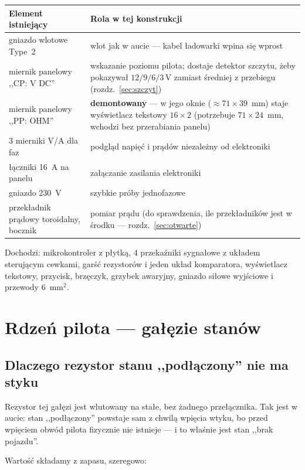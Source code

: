 \documentclass[a4paper,11pt]{article}
\newcommand{\volt}{\,\mathrm{V}}
\begin{document}
\begin{center}
\begin{tabular}{p{5.2cm}p{10.0cm}}
\toprule
Element istniejący & Rola w tej konstrukcji \\
\midrule
gniazdo wlotowe Type~2 & wlot jak w aucie --- kabel ładowarki wpina się wprost \\
miernik panelowy ,,CP: V DC'' & wskazanie poziomu pilota; dostaje detektor
  szczytu, żeby pokazywał $12/9/6/3\volt$ zamiast średniej z przebiegu
  (rozdz.~\ref{sec:szczyt}) \\
miernik panelowy ,,PP: OHM'' & \textbf{demontowany} --- w jego oknie
  ($\approx 71\times39$~mm) staje wyświetlacz tekstowy $16\times2$
  (potrzebuje $71\times24$~mm, wchodzi bez przerabiania panelu) \\
3 mierniki V/A dla faz & podgląd napięć i prądów niezależny od elektroniki \\
łączniki 16~A na panelu & załączanie zasilania elektroniki \\
gniazdo 230~V & szybkie próby jednofazowe \\
przekładnik prądowy toroidalny, bocznik & pomiar prądu (do sprawdzenia, ile
  przekładników jest w środku --- rozdz.~\ref{sec:otwarte}) \\
\bottomrule
\end{tabular}
\end{center}

\noindent Dochodzi: mikrokontroler z płytką, 4 przekaźniki sygnałowe z układem
sterującym cewkami, garść rezystorów i jeden układ komparatora, wyświetlacz
tekstowy, przycisk, brzęczyk, grzybek awaryjny, gniazdo siłowe wyjściowe i przewody
$6$~mm$^2$.

\section{Rdzeń pilota --- gałęzie stanów}
\label{sec:rdzen}

\subsection{Dlaczego rezystor stanu ,,podłączony'' nie ma styku}

Rezystor tej gałęzi jest wlutowany na stałe, bez żadnego przełącznika. Tak jest
w aucie: stan ,,podłączony'' powstaje sam z chwilą wpięcia wtyku, bo przed wpięciem
obwód pilota fizycznie nie istnieje --- i to właśnie jest stan ,,brak pojazdu''.

Wartość składamy z zapasu, szeregowo:
\end{document}

